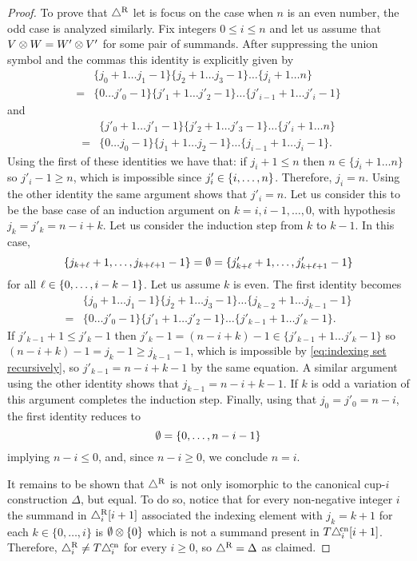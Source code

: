 \begin{proof}
	To prove that $\triangle^{\mathrm{R}}$ let is focus on the case when $n$ is an even number, the odd case is analyzed similarly.
	Fix integers $0 \leq i \leq n$ and let us assume that $V \otimes W = W' \otimes V'$ for some pair of summands.
	After suppressing the union symbol and the commas this identity is explicitly given by
	\begin{align*}
		&\{j_0+1 \dots j_1-1\} \{j_2+1 \dots j_3-1\} \dots \{j_i+1 \dots n\} \\=
		&\{0 \dots j'_0-1\} \{j'_1+1 \dots j'_2-1\} \dots \{j'_{i-1}+1 \dots j'_i-1\}
	\end{align*}
	and
	\begin{align*}
		&\{j'_0+1 \dots j'_1-1\} \{j'_2+1 \dots j'_3-1\} \dots \{j'_i+1 \dots n\} \\=
		&\{0 \dots j_0-1\} \{j_1+1 \dots j_2-1\} \dots \{j_{i-1}+1 \dots j_i-1\}.
	\end{align*}
	Using the first of these identities we have that: if $j_i+1 \leq n$ then $n \in \{j_i+1 \dots n\}$ so $j'_i-1 \geq n$, which is impossible since $j'_i \in \{i,\dots,n\}$.
	Therefore, $j_i = n$.
	Using the other identity the same argument shows that $j'_i = n$.
	Let us consider this to be the base case of an induction argument on $k = i,i-1,\dots,0$, with hypothesis $j_k = j'_k = n-i+k$.
	Let us consider the induction step from $k$ to $k-1$.
	In this case,
	\[
	\{j_{k+\ell}+1,\dots,j_{k+\ell+1}-1\} = \emptyset = \{j'_{k+\ell}+1,\dots,j'_{k+\ell+1}-1\}
	\]
	for all $\ell \in \{0,\dots,i-k-1\}$.
	Let us assume $k$ is even.
	The first identity becomes
	\begin{align*}
		&\{j_0+1 \dots j_1-1\} \{j_2+1 \dots j_3-1\} \dots \{j_{k-2}+1 \dots j_{k-1}-1\} \\=
		&\{0 \dots j'_0-1\} \{j'_1+1 \dots j'_2-1\} \dots \{j'_{k-1}+1 \dots j'_k-1\}.
	\end{align*}
	If $j'_{k-1}+1 \leq j'_k-1$ then $j'_k - 1 = (n-i+k) - 1 \in \{j'_{k-1}+1 \dots j'_k-1\}$ so $(n-i+k)-1 = j_k - 1 \geq j_{k-1}-1$, which is impossible by \cref{eq:indexing set recursively}, so $j'_{k-1} = n-i+k-1$ by the same equation.
	A similar argument using the other identity shows that $j_{k-1} = n-i+k-1$.
	If $k$ is odd a variation of this argument completes the induction step.
	Finally, using that $j_0 = j'_0 = n-i$, the first identity reduces to
	\[
	\emptyset = \{0,\dots, n-i-1\}
	\]
	implying $n-i \leq 0$, and, since $n-i \geq 0$, we conclude $n=i$.

	It remains to be shown that $\triangle^{\mathrm{R}}$ is not only isomorphic to the canonical \mbox{cup-$i$} construction $\Delta$, but equal.
	To do so, notice that for every non-negative integer $i$ the summand in $\triangle_i^{\mathrm{R}}[i+1]$ associated the indexing element with $j_k = k+1$ for each $k \in \{0,\dots,i\}$ is $\emptyset \otimes \{0\}$ which is not a summand present in $T \triangle^{\!\mathrm{cn}}_i[i+1]$.
	Therefore, $\triangle_i^{\mathrm{R}} \neq T \triangle^{\!\mathrm{cn}}_i$ for every $i \geq 0$, so $\triangle^{\mathrm{R}} = \Delta$ as claimed.
\end{proof}
